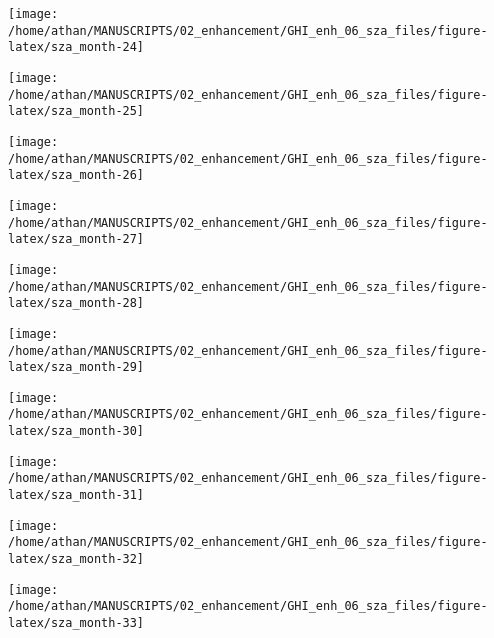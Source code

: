 \documentclass[
  10pt,
  a4paper,oneside]{article}
\begin{document}
\begin{center}\texttt{[image: /home/athan/MANUSCRIPTS/02\_enhancement/GHI\_enh\_06\_sza\_files/figure-latex/sza\_month-24]} \end{center}

\begin{center}\texttt{[image: /home/athan/MANUSCRIPTS/02\_enhancement/GHI\_enh\_06\_sza\_files/figure-latex/sza\_month-25]} \end{center}

\begin{center}\texttt{[image: /home/athan/MANUSCRIPTS/02\_enhancement/GHI\_enh\_06\_sza\_files/figure-latex/sza\_month-26]} \end{center}

\begin{center}\texttt{[image: /home/athan/MANUSCRIPTS/02\_enhancement/GHI\_enh\_06\_sza\_files/figure-latex/sza\_month-27]} \end{center}

\begin{center}\texttt{[image: /home/athan/MANUSCRIPTS/02\_enhancement/GHI\_enh\_06\_sza\_files/figure-latex/sza\_month-28]} \end{center}

\begin{center}\texttt{[image: /home/athan/MANUSCRIPTS/02\_enhancement/GHI\_enh\_06\_sza\_files/figure-latex/sza\_month-29]} \end{center}

\begin{center}\texttt{[image: /home/athan/MANUSCRIPTS/02\_enhancement/GHI\_enh\_06\_sza\_files/figure-latex/sza\_month-30]} \end{center}

\begin{center}\texttt{[image: /home/athan/MANUSCRIPTS/02\_enhancement/GHI\_enh\_06\_sza\_files/figure-latex/sza\_month-31]} \end{center}

\begin{center}\texttt{[image: /home/athan/MANUSCRIPTS/02\_enhancement/GHI\_enh\_06\_sza\_files/figure-latex/sza\_month-32]} \end{center}

\begin{center}\texttt{[image: /home/athan/MANUSCRIPTS/02\_enhancement/GHI\_enh\_06\_sza\_files/figure-latex/sza\_month-33]} \end{center}
\end{document}
